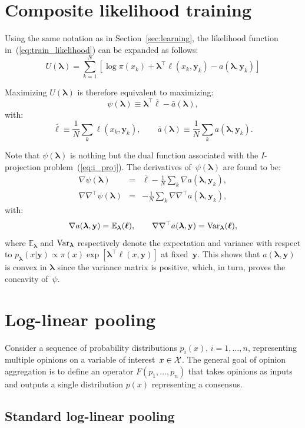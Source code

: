 \documentclass[english]{scrartcl}
\def\y{{\mathbf{y}}}
\newcommand{\blambda}{{\boldsymbol{\lambda}}}
\newcommand{\bell}{{\boldsymbol{\ell}}}
\newcommand{\E}{\mathbb{E}}
\begin{document}
\section{Composite likelihood training}
\label{app:training}

Using the same notation as in Section~\ref{sec:learning}, the likelihood function in~(\ref{eq:train_likelihood}) can be expanded as follows:
$$
U(\blambda) 
= \sum_{k=1}^N \left[
\log \pi(x_k) + \blambda^\top \bell(x_k, \y_k) - a(\blambda,\y_k)
\right]
$$

Maximizing $U(\blambda)$ is therefore equivalent to maximizing: 
$$
\psi(\blambda) \equiv \blambda^\top \bar{\bell} - \bar{a}(\blambda), 
$$
with:
$$
\bar{\bell} \equiv \frac{1}{N} \sum_k \bell(x_k,\y_k),
\qquad
\bar{a}(\blambda) \equiv \frac{1}{N} \sum_k a(\blambda,\y_k).
$$

Note that $\psi(\blambda)$ is nothing but the dual function associated with the $I$-projection problem~(\ref{eq:i_proj}). The derivatives of~$\psi(\blambda)$ are found to be:
\begin{eqnarray*}
\nabla\psi(\blambda)
 & = & \bar{\bell} - \frac{1}{N} \sum_k \nabla a(\blambda,\y_k), \\
\nabla\nabla^\top\psi(\blambda)
 & = & - \frac{1}{N} \sum_k \nabla \nabla^\top a(\blambda,\y_k),
\end{eqnarray*}
with:
$$
\nabla a(\blambda,\y) = \E_{\blambda}(\bell),
\qquad
\nabla \nabla^\top a(\blambda,\y) = {\rm Var}_{\blambda}(\bell),
$$
where $\E_{\blambda}$ and ${\rm Var}_{\blambda}$ respectively denote the expectation and variance with respect to $p_\blambda(x|\y)\propto \pi(x)\exp[\blambda^\top \bell(x,\y)]$ at fixed~$\y$. This shows that $a(\blambda,\y)$ is convex in $\blambda$ since the variance matrix is positive, which, in turn, proves the concavity of~$\psi$.



\section{Log-linear pooling}
\label{app:log_pool}

Consider a sequence of probability distributions $p_i(x)$, $i=1,\ldots,n$, representing multiple opinions on a variable of interest~$x\in{\cal X}$. The general goal of opinion aggregation is to define an operator $F(p_1,\ldots,p_n)$ that takes opinions as inputs and outputs a single distribution $p(x)$ representing a consensus.

\subsection{Standard log-linear pooling}
\label{app:log_pool_standard}
\end{document}

